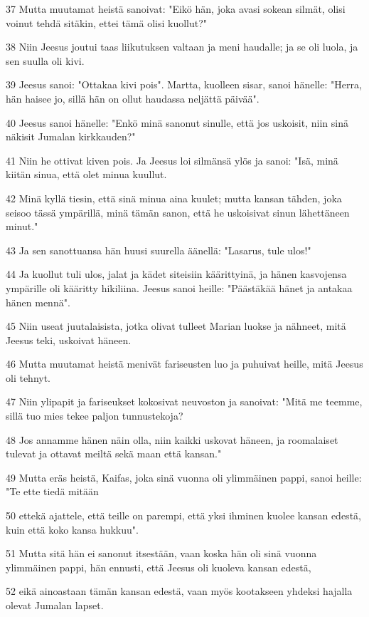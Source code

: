\par 37 Mutta muutamat heistä sanoivat: "Eikö hän, joka avasi sokean silmät, olisi voinut tehdä sitäkin, ettei tämä olisi kuollut?"
\par 38 Niin Jeesus joutui taas liikutuksen valtaan ja meni haudalle; ja se oli luola, ja sen suulla oli kivi.
\par 39 Jeesus sanoi: "Ottakaa kivi pois". Martta, kuolleen sisar, sanoi hänelle: "Herra, hän haisee jo, sillä hän on ollut haudassa neljättä päivää".
\par 40 Jeesus sanoi hänelle: "Enkö minä sanonut sinulle, että jos uskoisit, niin sinä näkisit Jumalan kirkkauden?"
\par 41 Niin he ottivat kiven pois. Ja Jeesus loi silmänsä ylös ja sanoi: "Isä, minä kiitän sinua, että olet minua kuullut.
\par 42 Minä kyllä tiesin, että sinä minua aina kuulet; mutta kansan tähden, joka seisoo tässä ympärillä, minä tämän sanon, että he uskoisivat sinun lähettäneen minut."
\par 43 Ja sen sanottuansa hän huusi suurella äänellä: "Lasarus, tule ulos!"
\par 44 Ja kuollut tuli ulos, jalat ja kädet siteisiin käärittyinä, ja hänen kasvojensa ympärille oli kääritty hikiliina. Jeesus sanoi heille: "Päästäkää hänet ja antakaa hänen mennä".
\par 45 Niin useat juutalaisista, jotka olivat tulleet Marian luokse ja nähneet, mitä Jeesus teki, uskoivat häneen.
\par 46 Mutta muutamat heistä menivät fariseusten luo ja puhuivat heille, mitä Jeesus oli tehnyt.
\par 47 Niin ylipapit ja fariseukset kokosivat neuvoston ja sanoivat: "Mitä me teemme, sillä tuo mies tekee paljon tunnustekoja?
\par 48 Jos annamme hänen näin olla, niin kaikki uskovat häneen, ja roomalaiset tulevat ja ottavat meiltä sekä maan että kansan."
\par 49 Mutta eräs heistä, Kaifas, joka sinä vuonna oli ylimmäinen pappi, sanoi heille: "Te ette tiedä mitään
\par 50 ettekä ajattele, että teille on parempi, että yksi ihminen kuolee kansan edestä, kuin että koko kansa hukkuu".
\par 51 Mutta sitä hän ei sanonut itsestään, vaan koska hän oli sinä vuonna ylimmäinen pappi, hän ennusti, että Jeesus oli kuoleva kansan edestä,
\par 52 eikä ainoastaan tämän kansan edestä, vaan myös kootakseen yhdeksi hajalla olevat Jumalan lapset.
